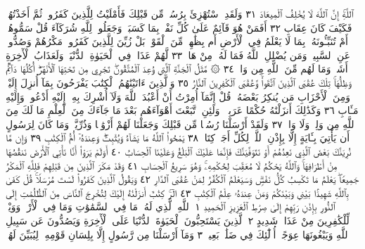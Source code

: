 ٱللَّهِۚ إِنَّ ٱللَّهَ لَا يُخْلِفُ ٱلْمِيعَادَ ٣١ وَلَقَدِ ٱسْتُهْزِئَ بِرُسُلࣲ مِّن
قَبْلِكَ فَأَمْلَيْتُ لِلَّذِينَ كَفَرُوا۟ ثُمَّ أَخَذْتُهُمْۖ فَكَيْفَ كَانَ
عِقَابِ ٣٢ أَفَمَنْ هُوَ قَآئِمٌ عَلَىٰ كُلِّ نَفْسِۭ بِمَا كَسَبَتْۗ وَجَعَلُوا۟
لِلَّهِ شُرَكَآءَ قُلْ سَمُّوهُمْۚ أَمْ تُنَبِّـُٔونَهُۥ بِمَا لَا يَعْلَمُ فِي ٱلْأَرْضِ أَم
بِظَٰهِرࣲ مِّنَ ٱلْقَوْلِۗ بَلْ زُيِّنَ لِلَّذِينَ كَفَرُوا۟ مَكْرُهُمْ وَصُدُّوا۟ عَنِ
ٱلسَّبِيلِۗ وَمَن يُضْلِلِ ٱللَّهُ فَمَا لَهُۥ مِنْ هَادࣲ ٣٣ لَّهُمْ عَذَابࣱ فِي ٱلْحَيَوٰةِ
ٱلدُّنْيَاۖ وَلَعَذَابُ ٱلْأٓخِرَةِ أَشَقُّۖ وَمَا لَهُم مِّنَ ٱللَّهِ مِن وَاقࣲ ٣٤
۞ مَّثَلُ ٱلْجَنَّةِ ٱلَّتِي وُعِدَ ٱلْمُتَّقُونَۖ تَجْرِي مِن تَحْتِهَا ٱلْأَنْهَٰرُۖ
أُكُلُهَا دَآئِمࣱ وَظِلُّهَاۚ تِلْكَ عُقْبَى ٱلَّذِينَ ٱتَّقَوا۟ۚ وَّعُقْبَى
ٱلْكَٰفِرِينَ ٱلنَّارُ ٣٥ وَٱلَّذِينَ ءَاتَيْنَٰهُمُ ٱلْكِتَٰبَ يَفْرَحُونَ
بِمَآ أُنزِلَ إِلَيْكَۖ وَمِنَ ٱلْأَحْزَابِ مَن يُنكِرُ بَعْضَهُۥۚ قُلْ إِنَّمَآ
أُمِرْتُ أَنْ أَعْبُدَ ٱللَّهَ وَلَآ أُشْرِكَ بِهِۦٓۚ إِلَيْهِ أَدْعُوا۟ وَإِلَيْهِ مَـَٔابِ ٣٦
وَكَذَٰلِكَ أَنزَلْنَٰهُ حُكْمًا عَرَبِيࣰّاۚ وَلَئِنِ ٱتَّبَعْتَ أَهْوَآءَهُم بَعْدَ
مَا جَآءَكَ مِنَ ٱلْعِلْمِ مَا لَكَ مِنَ ٱللَّهِ مِن وَلِيࣲّ وَلَا وَاقࣲ ٣٧ وَلَقَدْ
أَرْسَلْنَا رُسُلࣰا مِّن قَبْلِكَ وَجَعَلْنَا لَهُمْ أَزْوَٰجࣰا وَذُرِّيَّةࣰۚ وَمَا كَانَ
لِرَسُولٍ أَن يَأْتِيَ بِـَٔايَةٍ إِلَّا بِإِذْنِ ٱللَّهِۗ لِكُلِّ أَجَلࣲ كِتَابࣱ ٣٨
يَمْحُوا۟ ٱللَّهُ مَا يَشَآءُ وَيُثْبِتُۖ وَعِندَهُۥٓ أُمُّ ٱلْكِتَٰبِ ٣٩ وَإِن مَّا
نُرِيَنَّكَ بَعْضَ ٱلَّذِي نَعِدُهُمْ أَوْ نَتَوَفَّيَنَّكَ فَإِنَّمَا عَلَيْكَ ٱلْبَلَٰغُ
وَعَلَيْنَا ٱلْحِسَابُ ٤٠ أَوَلَمْ يَرَوْا۟ أَنَّا نَأْتِي ٱلْأَرْضَ نَنقُصُهَا
مِنْ أَطْرَافِهَاۚ وَٱللَّهُ يَحْكُمُ لَا مُعَقِّبَ لِحُكْمِهِۦۚ وَهُوَ سَرِيعُ
ٱلْحِسَابِ ٤١ وَقَدْ مَكَرَ ٱلَّذِينَ مِن قَبْلِهِمْ فَلِلَّهِ ٱلْمَكْرُ جَمِيعࣰاۖ
يَعْلَمُ مَا تَكْسِبُ كُلُّ نَفْسࣲۗ وَسَيَعْلَمُ ٱلْكُفَّٰرُ لِمَنْ عُقْبَى ٱلدَّارِ ٤٢
وَيَقُولُ ٱلَّذِينَ كَفَرُوا۟ لَسْتَ مُرْسَلࣰاۚ قُلْ كَفَىٰ بِٱللَّهِ شَهِيدَۢا
بَيْنِي وَبَيْنَكُمْ وَمَنْ عِندَهُۥ عِلْمُ ٱلْكِتَٰبِ ٤٣
الٓرۚ كِتَٰبٌ أَنزَلْنَٰهُ إِلَيْكَ لِتُخْرِجَ ٱلنَّاسَ مِنَ ٱلظُّلُمَٰتِ
إِلَى ٱلنُّورِ بِإِذْنِ رَبِّهِمْ إِلَىٰ صِرَٰطِ ٱلْعَزِيزِ ٱلْحَمِيدِ ١
ٱللَّهِ ٱلَّذِي لَهُۥ مَا فِي ٱلسَّمَٰوَٰتِ وَمَا فِي ٱلْأَرْضِۗ وَوَيْلࣱ
لِّلْكَٰفِرِينَ مِنْ عَذَابࣲ شَدِيدٍ ٢ ٱلَّذِينَ يَسْتَحِبُّونَ
ٱلْحَيَوٰةَ ٱلدُّنْيَا عَلَى ٱلْأٓخِرَةِ وَيَصُدُّونَ عَن سَبِيلِ
ٱللَّهِ وَيَبْغُونَهَا عِوَجًاۚ أُو۟لَٰٓئِكَ فِي ضَلَٰلِۭ بَعِيدࣲ ٣ وَمَآ
أَرْسَلْنَا مِن رَّسُولٍ إِلَّا بِلِسَانِ قَوْمِهِۦ لِيُبَيِّنَ لَهُمْۖ
